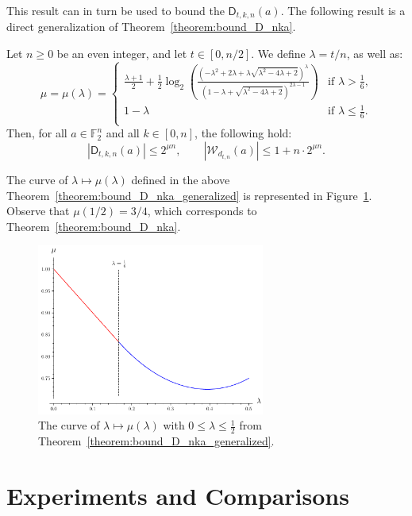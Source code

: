 \documentclass[runningheads,orivec]{llncs}
\newcommand{\Dtkna}[4]{\mathsf{D}_{#1,#2,#3}(#4)}
\newcommand{\F}{\mathbb{F}}
\newcommand{\wt}[1]{\mathcal W_{#1}}
\let\leq=\leqslant
\let\geq=\geqslant
\begin{document}
    This result can in turn be used to bound the $\Dtkna{t}{k}{n}{a}$.
    The following result is a direct generalization of Theorem~\ref{theorem:bound_D_nka}.
    
    \begin{theorem}\label{theorem:bound_D_nka_generalized}
        Let $n\geq 0$ be an even integer, and let $t\in[0,n/2]$. We define $\lambda=t/n$, as well as:
        \[
            \mu=\mu(\lambda)=
            \begin{cases}
                \frac{\lambda+1}{2}+\frac12\log_2\left(\frac{\left(-\lambda^2+2\lambda+\lambda\sqrt{\lambda^2-4\lambda+2}\right)^\lambda}{\left(1-\lambda+\sqrt{\lambda^2-4\lambda+2}\right)^{2\lambda-1}}\right)&\text{if $\lambda>\frac 16$,}\\
                1-\lambda&\text{if $\lambda\leq\frac 16$.}\\
            \end{cases}
        \]
        Then, for all $a\in\F_2^n$ and all $k\in[0,n]$, the following hold:
        \[
            |\Dtkna tkna|\leq 2^{\mu n},\qquad  |\wt{d_{t,n}}(a)|\leq 1+n\cdot 2^{\mu n}.
        \]
    \end{theorem}
    
    The curve of $\lambda\mapsto\mu(\lambda)$ defined in the above Theorem~\ref{theorem:bound_D_nka_generalized} is represented in Figure~\ref{fig:curve_exponents_lambda_mu}. Observe that $\mu(1/2)=3/4$, which corresponds to Theorem~\ref{theorem:bound_D_nka}.
    
    \begin{figure}
    	\centering
    	\includegraphics[width=7.5cm]{graphs/curve_exponents_lambda_mu.pdf}
    	\caption{The curve of $\lambda\mapsto\mu(\lambda)$ with $0\leq\lambda\leq\frac 12$ from Theorem~\ref{theorem:bound_D_nka_generalized}.}
    	\label{fig:curve_exponents_lambda_mu}
    \end{figure}
    
    \section{Experiments and Comparisons}\label{sec:expAndComp}
    
\end{document}
